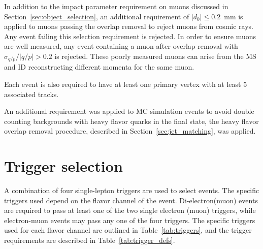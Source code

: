 In addition to the impact parameter requirement on muons discussed in
Section~\ref{sec:object_selection}, an additional requirement of
$|d_0| \leq 0.2$~mm is applied to muons passing the overlap removal to reject
muons from cosmic rays. Any event failing this selection requirement is
rejected.
In order to ensure muons are well measured, any event containing a muon after
overlap removal with $\sigma_{q/p}/|q/p| > 0.2$ is rejected.
These poorly measured muons can arise from the MS and ID reconstructing
different momenta for the same muon.

Each event is also required to have at least one primary vertex with at least
5 associated tracks.

An additional requirement was applied to MC simulation events to avoid double
counting backgrounds with heavy flavor quarks in the final state, the heavy
flavor overlap removal procedure, described in Section~\ref{sec:jet_matching},
was applied.

\section{Trigger selection}
\label{sec:trigger_selection}

A combination of four single-lepton triggers are used to select events.
The specific triggers used depend on the flavor channel of the event.
Di-electron(muon) events are required to pass at least one of the two single
electron (muon) triggers, while electron-muon events may pass any one of the
four triggers.
The specific triggers used for each flavor channel are outlined in
Table~\ref{tab:triggers}, and the trigger requirements are described in
Table~\ref{tab:trigger_defs}.

\begin{table}[ht]
  \caption{Trigger selection for each final state. If the event passes any of
    the triggers for the given final state, the event is accepted.
  }
  \label{tab:triggers}
\end{table}

